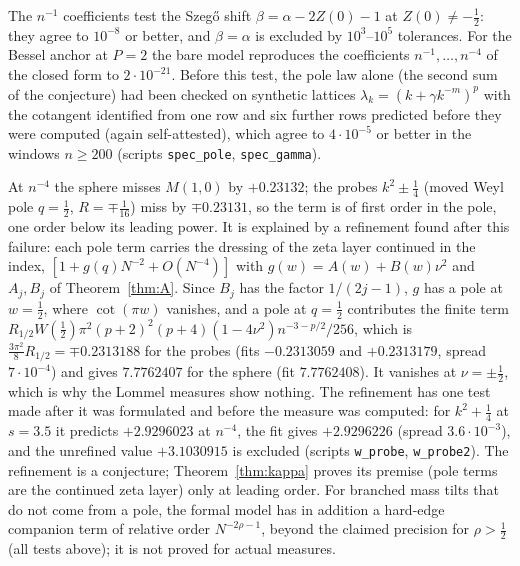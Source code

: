 The $n^{-1}$ coefficients test the Szeg\H{o} shift $\beta=\alpha-2Z(0)-1$ at $Z(0)\ne-\frac12$: they agree to $10^{-8}$ or better, and $\beta=\alpha$ is
excluded by $10^3$--$10^5$ tolerances. For the Bessel anchor at $P=2$ the bare model reproduces the coefficients $n^{-1},\dots,n^{-4}$ of the
closed form to $2\cdot10^{-21}$. Before this test, the pole law alone (the second sum of the conjecture) had been checked on synthetic lattices
$\lambda_k=(k+\gamma k^{-m})^p$ with the cotangent identified from one row and six further rows predicted before they were computed
(again self-attested), which agree to $4\cdot10^{-5}$ or
better in the windows $n\ge200$ (scripts \texttt{spec\_pole}, \texttt{spec\_gamma}).

\begin{remark}\label{rem:Wprime}
At $n^{-4}$ the sphere misses $M(1,0)$ by $+0.23132$; the probes $k^2\pm\frac14$ (moved Weyl pole $q=\frac12$, $R=\mp\frac1{16}$) miss by $\mp0.23131$,
so the term is of first order in the pole, one order below its leading power. It is explained by a refinement found after this failure: each
pole term carries the dressing of the zeta layer continued in the index, $[1+g(q)N^{-2}+O(N^{-4})]$ with $g(w)=A(w)+B(w)\nu^2$ and $A_j,B_j$ of
Theorem~\ref{thm:A}. Since $B_j$ has the factor $1/(2j-1)$, $g$ has a pole at $w=\frac12$, where $\cot(\pi w)$ vanishes, and a pole at $q=\frac12$
contributes the finite term $R_{1/2}W(\frac12)\pi^2(p+2)^2(p+4)(1-4\nu^2)n^{-3-p/2}/256$, which is $\frac{3\pi^2}8R_{1/2}=\mp0.2313188$ for the
probes (fits $-0.2313059$ and $+0.2313179$, spread $7\cdot10^{-4}$) and gives $7.7762407$ for the sphere (fit $7.7762408$). It vanishes at $\nu=\pm\frac12$, which is
why the Lommel measures show nothing. The refinement has one test made after it was formulated and before the measure was computed: for
$k^2+\frac14$ at $s=3.5$ it predicts $+2.9296023$ at $n^{-4}$, the fit gives $+2.9296226$ (spread $3.6\cdot10^{-3}$), and the unrefined value
$+3.1030915$ is excluded (scripts \texttt{w\_probe}, \texttt{w\_probe2}). The refinement is a conjecture; Theorem~\ref{thm:kappa} proves its premise
(pole terms are the continued zeta layer) only at leading order. For branched mass tilts that do not come from a pole, the formal model has in
addition a hard-edge companion term of relative order $N^{-2\rho-1}$, beyond the claimed precision for $\rho>\frac12$ (all tests above); it is not
proved for actual measures.
\end{remark}

